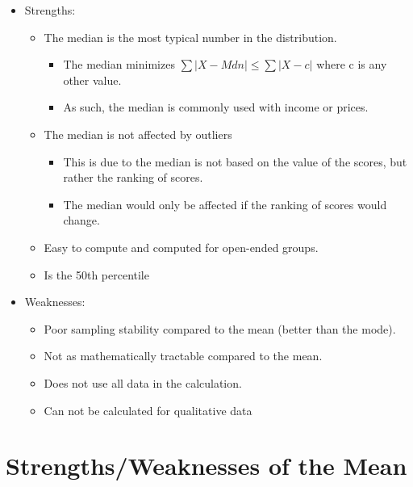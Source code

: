 \documentclass[12pt]{article}
\begin{document}
\begin{itemize}
\itemsep1pt\parskip0pt
\item
  Strengths:

  \begin{itemize}
  \itemsep1pt\parskip0pt
  \item
    The median is the most typical number in the distribution.

    \begin{itemize}
    \itemsep1pt\parskip0pt
    \item
      The median minimizes \(\sum |X - Mdn| \leq \sum |X - c|\) where c
      is any other value.
    \item
      As such, the median is commonly used with income or prices.
    \end{itemize}
  \item
    The median is not affected by outliers

    \begin{itemize}
    \itemsep1pt\parskip0pt
    \item
      This is due to the median is not based on the value of the scores,
      but rather the ranking of scores.
    \item
      The median would only be affected if the ranking of scores would
      change.
    \end{itemize}
  \item
    Easy to compute and computed for open-ended groups.
  \item
    Is the 50th percentile
  \end{itemize}
\item
  Weaknesses:

  \begin{itemize}
  \itemsep1pt\parskip0pt
  \item
    Poor sampling stability compared to the mean (better than the mode).
  \item
    Not as mathematically tractable compared to the mean.
  \item
    Does not use all data in the calculation.
  \item
    Can not be calculated for qualitative data
  \end{itemize}
\end{itemize}

\section{Strengths/Weaknesses of the
Mean}\label{strengthsweaknesses-of-the-mean}
\end{document}
